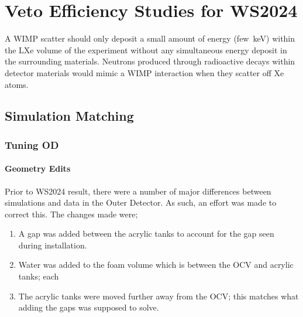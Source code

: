 \chapter{Veto Efficiency Studies for WS2024}
A WIMP scatter should only deposit a small amount of energy (few~keV) within the LXe volume of the experiment without any simultaneous energy deposit in the surrounding materials. Neutrons produced through radioactive decays within detector materials would mimic a WIMP interaction when they scatter off Xe atoms. 

\section{Simulation Matching}
\subsection{Tuning OD}
\subsubsection{Geometry Edits}\label{sec:GeometryEdits}
Prior to WS2024 result, there were a number of major differences between simulations and data in the Outer Detector. 
As such, an effort was made to correct this. 
The changes made were;
\begin{enumerate}
    \item A gap was added between the acrylic tanks to account for the gap seen during installation.
    \item Water was added to the foam volume which is between the OCV and acrylic tanks; each 
    \item The acrylic tanks were moved further away from the OCV; this matches what adding the gaps was supposed to solve.
\end{enumerate}

